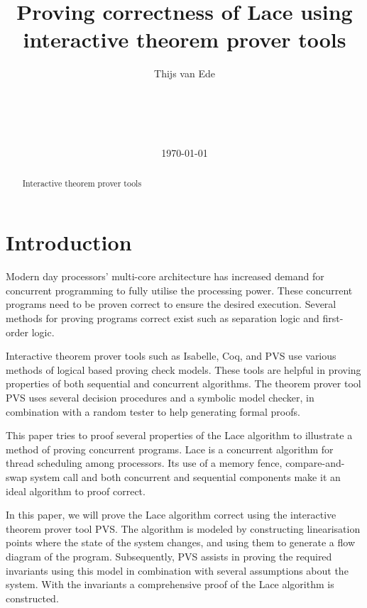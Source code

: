 \documentclass{sig-alternate-br}
\title{Proving correctness of Lace using interactive theorem prover tools}
\author{
	\alignauthor
	Thijs van Ede\\
	\affaddr{University of Twente}\\
	\affaddr{P.O. Box 217, 7500AE Enschede}\\
	\affaddr{The Netherlands}\\
	\affaddr{t.s.vanede@student.utwente.nl}\\
}
\date{\today}
\begin{document}
\maketitle

\begin{abstract}
Interactive theorem prover tools 
\end{abstract}


\section{Introduction}
Modern day processors' multi-core architecture has increased demand for concurrent programming to fully utilise the processing power.
These concurrent programs need to be proven correct to ensure the desired execution.
Several methods for proving programs correct exist such as separation logic\cite{reynolds2002} and first-order logic\cite{smullyan1995}.

Interactive theorem prover tools such as Isabelle\cite{paulson1994isabelle}, Coq\cite{coq2015}, and PVS\cite{owre1992pvs} use various methods of logical based proving check models.
These tools are helpful in proving properties of both sequential\cite{badban2005verification} and concurrent\cite{colvin2006formal} \cite{shankar1993verification} algorithms.
The theorem prover tool PVS uses several decision procedures and a symbolic model checker, in combination with a random tester to help generating formal proofs.

This paper tries to proof several properties of the Lace algorithm\cite{vanDijk2014206} to illustrate a method of proving concurrent programs.
Lace is a concurrent algorithm for thread scheduling among processors.
Its use of a memory fence, compare-and-swap system call and both concurrent and sequential components make it an ideal algorithm to proof correct.

In this paper, we will prove the Lace algorithm correct using the interactive theorem prover tool PVS.
The algorithm is modeled by constructing linearisation points where the state of the system changes, and using them to generate a flow diagram of the program.
Subsequently, PVS assists in proving the required invariants using this model in combination with several assumptions about the system.
With the invariants a comprehensive proof of the Lace algorithm is constructed.
\end{document}
